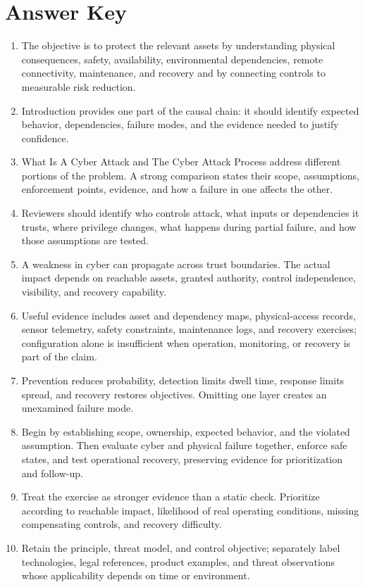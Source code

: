 \documentclass[11pt,letterpaper]{article}
\begin{document}
\section*{Answer Key}
\begin{enumerate}
\item The objective is to protect the relevant assets by understanding physical consequences, safety, availability, environmental dependencies, remote connectivity, maintenance, and recovery and by connecting controls to measurable risk reduction.
\item Introduction provides one part of the causal chain: it should identify expected behavior, dependencies, failure modes, and the evidence needed to justify confidence.
\item What Is A Cyber Attack and The Cyber Attack Process address different portions of the problem. A strong comparison states their scope, assumptions, enforcement points, evidence, and how a failure in one affects the other.
\item Reviewers should identify who controls attack, what inputs or dependencies it trusts, where privilege changes, what happens during partial failure, and how those assumptions are tested.
\item A weakness in cyber can propagate across trust boundaries. The actual impact depends on reachable assets, granted authority, control independence, visibility, and recovery capability.
\item Useful evidence includes asset and dependency maps, physical-access records, sensor telemetry, safety constraints, maintenance logs, and recovery exercises; configuration alone is insufficient when operation, monitoring, or recovery is part of the claim.
\item Prevention reduces probability, detection limits dwell time, response limits spread, and recovery restores objectives. Omitting one layer creates an unexamined failure mode.
\item Begin by establishing scope, ownership, expected behavior, and the violated assumption. Then evaluate cyber and physical failure together, enforce safe states, and test operational recovery, preserving evidence for prioritization and follow-up.
\item Treat the exercise as stronger evidence than a static check. Prioritize according to reachable impact, likelihood of real operating conditions, missing compensating controls, and recovery difficulty.
\item Retain the principle, threat model, and control objective; separately label technologies, legal references, product examples, and threat observations whose applicability depends on time or environment.
\end{enumerate}
\end{document}
